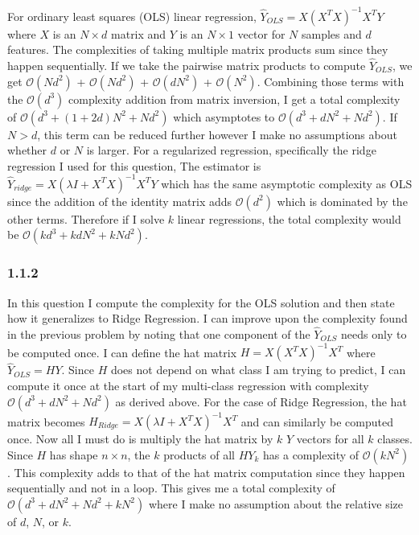 \documentclass[12pt]{amsart}
\begin{document}
For ordinary least squares (OLS) linear regression, $\hat{Y}_{OLS} = X(X^T X)^{-1}X^T Y$ where $X$ is an $N \times d$ matrix and $Y$ is an $N \times 1$ vector for $N$ samples and $d$ features.  The complexities of taking multiple matrix products sum since they happen sequentially.  If we take the pairwise matrix products to compute $\hat{Y}_{OLS}$, we get $\mathcal{O}(Nd^2)$ + $\mathcal{O}(Nd^2)$ + $\mathcal{O}(dN^2)$ + $\mathcal{O}(N^2)$.  Combining those terms with the $\mathcal{O}(d^3)$ complexity addition from matrix inversion, I get a total complexity of $\mathcal{O}(d^3 + (1+2d)N^2 + Nd^2)$ which asymptotes to $\mathcal{O}(d^3 + dN^2 + Nd^2)$.  If $N > d$, this term can be reduced further however I make no assumptions about whether $d$ or $N$ is larger.  For a regularized regression, specifically the ridge regression I used for this question, The estimator is $\hat{Y}_{ridge} = X(\lambda I + X^T X)^{-1}X^T Y$ which has the same asymptotic complexity as OLS since the addition of the identity matrix adds $\mathcal{O}(d^2)$ which is dominated by the other terms.  Therefore if I solve $k$ linear regressions, the total complexity would be $\mathcal{O}(kd^3 + kdN^2 + kNd^2)$.

\subsubsection*{1.1.2}

In this question I compute the complexity for the OLS solution and then state how it generalizes to Ridge Regression.  I can improve upon the complexity found in the previous problem by noting that one component of the $\hat{Y}_{OLS}$ needs only to be computed once.  I can define the hat matrix $H = X(X^T X)^{-1}X^T$ where $\hat{Y}_{OLS} = HY$.  Since $H$ does not depend on what class I am trying to predict, I can compute it once at the start of my multi-class regression with complexity $\mathcal{O}(d^3 + dN^2 + Nd^2)$ as derived above.  For the case of Ridge Regression, the hat matrix becomes $H_{Ridge} = X(\lambda I + X^T X)^{-1}X^T$ and can similarly be computed once.  Now all I must do is multiply the hat matrix by $k$ $Y$ vectors for all $k$ classes.  Since $H$ has shape $n \times n$, the $k$ products of all $HY_k$ has a complexity of $\mathcal{O}(kN^2)$.  This complexity adds to that of the hat matrix computation since they happen sequentially and not in a loop.  This gives me a total complexity of $\mathcal{O}(d^3 + dN^2 + Nd^2 + kN^2)$ where I make no assumption about the relative size of $d$, $N$, or $k$.
\end{document}
